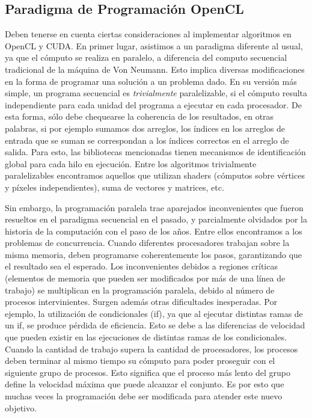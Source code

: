 \subsection{Paradigma de Programación OpenCL}
Deben tenerse en cuenta ciertas consideraciones al implementar algoritmos en OpenCL y CUDA.
En primer lugar, asistimos a un paradigma diferente al usual, ya que el cómputo se realiza en paralelo, a diferencia del computo secuencial tradicional de la máquina de Von Neumann.
Esto implica diversas modificaciones en la forma de programar una solución a un problema dado.
En su versión más simple, un programa secuencial es {\em trivialmente} paralelizable, si el cómputo resulta independiente para cada unidad del programa a ejecutar en cada procesador.
De esta forma, sólo debe chequearse la coherencia de los resultados, en otras palabras, si por ejemplo sumamos dos arreglos, los índices en los arreglos de entrada que se suman se correspondan a los índices correctos en el arreglo de salida.
Para esto, las bibliotecas mencionadas tienen mecanismos de identificación global para cada hilo en ejecución.
Entre los algoritmos trivialmente paralelizables encontramos aquellos que utilizan shaders (cómputos sobre vértices y píxeles independientes), suma de vectores y matrices, etc.

Sin embargo, la programación paralela trae aparejados inconvenientes que fueron resueltos en el paradigma secuencial en el pasado, y parcialmente olvidados por la historia de la computación con el paso de los años.
Entre ellos encontramos a los problemas de concurrencia.
Cuando diferentes procesadores trabajan sobre la misma memoria, deben programarse coherentemente los pasos, garantizando que el resultado sea el esperado.
Los inconvenientes debidos a regiones críticas (elementos de memoria que pueden ser modificados por más de una línea de trabajo) se multiplican en la programación paralela, debido al número de procesos intervinientes.
Surgen además otras dificultades inesperadas.
Por ejemplo, la utilización de condicionales (if), ya que al ejecutar distintas ramas de un if, se produce pérdida de eficiencia.
Esto se debe a las diferencias de velocidad que pueden existir en las ejecuciones de distintas ramas de los condicionales.
Cuando la cantidad de trabajo supera la cantidad de procesadores, los procesos deben terminar al mismo tiempo su cómputo para poder proseguir con el siguiente grupo de procesos.
Esto significa que el proceso más lento del grupo define la velocidad máxima que puede alcanzar el conjunto.
Es por esto que muchas veces la programación debe ser modificada para atender este nuevo objetivo.


